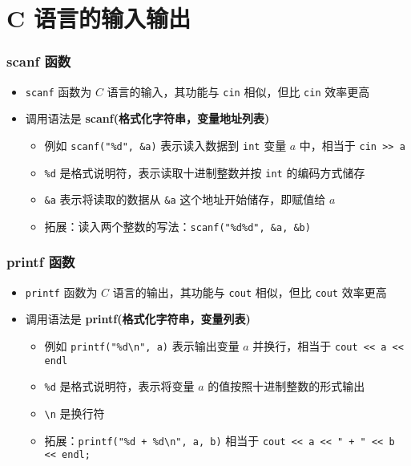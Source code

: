 \section{C 语言的输入输出}

\begin{frame}[fragile]
    \frametitle{scanf 函数}

    \begin{itemize}
       \item \lstinline|scanf| 函数为 $C$ 语言的输入，其功能与 \lstinline|cin| 相似，但比 \lstinline|cin| 效率更高
       \item 调用语法是 \textbf{scanf(格式化字符串，变量地址列表)}
    
        \begin{itemize}
           \item<2-> 例如 \lstinline|scanf("%d", &a)| 表示读入数据到 \lstinline|int| 变量 $a$ 中，相当于 \lstinline|cin >> a|
           \item<2-> \lstinline|%d| 是格式说明符，表示读取十进制整数并按 \lstinline|int| 的编码方式储存
           \item<2-> \lstinline|&a| 表示将读取的数据从 \lstinline|&a| 这个地址开始储存，即赋值给 $a$
           \item<3> 拓展：读入两个整数的写法：\lstinline|scanf("%d%d", &a, &b)|
        \end{itemize}
    \end{itemize}
    
\end{frame}

\begin{frame}[fragile]
    \frametitle{printf 函数}

    \begin{itemize}
       \item \lstinline|printf| 函数为 $C$ 语言的输出，其功能与 \lstinline|cout| 相似，但比 \lstinline|cout| 效率更高
       \item 调用语法是 \textbf{printf(格式化字符串，变量列表)}
    
        \begin{itemize}
           \item<2-> 例如 \lstinline|printf("%d\n", a)| 表示输出变量 $a$ 并换行，相当于 \lstinline|cout << a << endl|
           \item<2-> \lstinline|%d| 是格式说明符，表示将变量 $a$ 的值按照十进制整数的形式输出
           \item<2-> \lstinline|\n| 是换行符
           \item<3> 拓展：\lstinline|printf("%d + %d\n", a, b)| 相当于 \lstinline|cout << a << " + " << b << endl;|
        \end{itemize}
    \end{itemize}
    
\end{frame}

